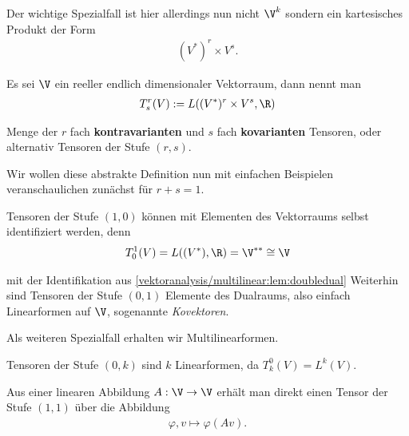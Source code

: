 \par
Der wichtige Spezialfall ist hier allerdings nun nicht \(\V^k\) sondern ein kartesisches Produkt der Form
\begin{align*}
(V^\ast)^r\times V^s.
\end{align*}\label{vektoranalysis/tensor:definition-5}
\begin{definition}{}{}



\par
Es sei \(\V\) ein reeller endlich dimensionaler Vektorraum, dann nennt man
\begin{align*}
T^r_s(V) := L((V^\ast)^r\times V^s, \R)
\end{align*}
\par
Menge der \(r\) fach \textbf{kontravarianten} und \(s\) fach \textbf{kovarianten} Tensoren, oder alternativ Tensoren der Stufe \((r,s)\).
\end{definition}

\par
Wir wollen diese abstrakte Definition nun mit einfachen Beispielen veranschaulichen zunächst für \(r+s=1\).
\label{vektoranalysis/tensor:example-6}
\begin{example}{}{}



\par
Tensoren der Stufe \((1,0)\) können mit Elementen des Vektorraums selbst identifiziert werden, denn
\begin{align*}
T^1_0(V) = L((V^\ast), \R) = \V^{\ast\ast}\cong \V
\end{align*}
\par
mit der Identifikation aus \cref{vektoranalysis/multilinear:lem:doubledual}  Weiterhin sind Tensoren der Stufe \((0,1)\) Elemente des
Dualraums, also einfach Linearformen auf \(\V\), sogenannte \emph{Kovektoren}.
\end{example}

\par
Als weiteren Spezialfall erhalten wir Multilinearformen.
\label{vektoranalysis/tensor:example-7}
\begin{example}{}{}



\par
Tensoren der Stufe \((0,k)\) sind \(k\) Linearformen, da \(T^0_k(V) = L^k(V)\).
\end{example}
\label{vektoranalysis/tensor:example-8}
\begin{example}{}{}



\par
Aus einer linearen Abbildung \(A:\V\to\V\) erhält man direkt einen Tensor der Stufe \((1,1)\) über die Abbildung
\begin{align*}
\varphi, v \mapsto \varphi(Av).
\end{align*}\end{example}


